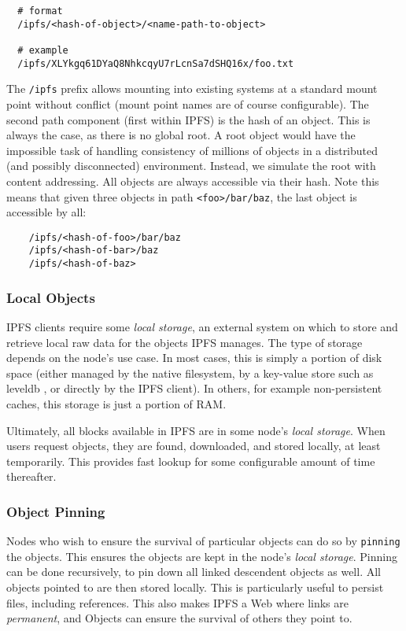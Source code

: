 \documentclass{sig-alternate}
\begin{document}
\begin{verbatim}
  # format
  /ipfs/<hash-of-object>/<name-path-to-object>

  # example
  /ipfs/XLYkgq61DYaQ8NhkcqyU7rLcnSa7dSHQ16x/foo.txt
\end{verbatim}

The \texttt{/ipfs} prefix allows mounting into existing systems at a standard mount point without conflict (mount point names are of course configurable). The second path component (first within IPFS) is the hash of an object. This is always the case, as there is no global root. A root object would have the impossible task of handling consistency of millions of objects in a distributed (and possibly disconnected) environment. Instead, we simulate the root with content addressing. All objects are always accessible via their hash. Note this means that given three objects in path \texttt{<foo>/bar/baz}, the last object is accessible by all:

\begin{verbatim}
    /ipfs/<hash-of-foo>/bar/baz
    /ipfs/<hash-of-bar>/baz
    /ipfs/<hash-of-baz>
\end{verbatim}

\subsubsection{Local Objects}

IPFS clients require some \textit{local storage}, an external system
on which to store and retrieve local raw data for the objects IPFS manages.
The type of storage depends on the node's use case.
In most cases, this is simply a portion of disk space (either managed by
the native filesystem, by a key-value store such as leveldb \cite{leveldb}, or
directly by the IPFS client). In others, for example non-persistent caches,
this storage is just a portion of RAM.

Ultimately, all blocks available in IPFS are in some node's
\textit{local storage}. When users request objects, they are
found, downloaded, and stored locally, at least temporarily. This provides
fast lookup for some configurable amount of time thereafter.

\subsubsection{Object Pinning}

Nodes who wish to ensure the survival of particular objects can do so by
\texttt{pinning} the objects. This ensures the objects are kept in the node's
\textit{local storage}. Pinning can be done recursively, to pin down all
linked descendent objects as well. All objects pointed to are then stored
locally. This is particularly useful to persist files, including references.
This also makes IPFS a Web where links are \textit{permanent}, and Objects can
ensure the survival of others they point to.
\end{document}
